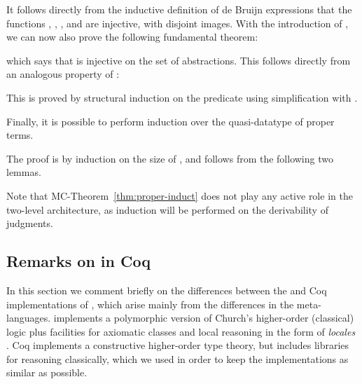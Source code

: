 \documentclass[final]{svjour3}
\begin{document}
It follows directly from the inductive definition of de Bruijn
expressions that the functions , , , and
 are injective, with disjoint images.  With the introduction
of , we can now also prove the following fundamental
theorem:
\begin{goal}
  
\label{thm:inj}
\end{goal}
which says that  is injective on the set of abstractions.
This follows directly from an analogous property of :
\begin{mclemma}
  
\end{mclemma}
This is proved by structural induction on the  predicate
using simplification with  .


Finally, it is possible to perform induction over the quasi-datatype
of proper terms.
\begin{goal}
\label{thm:proper-induct}
 
\end{goal}
The proof is by induction on the size of , and follows from the
following two lemmas.
\begin{mclemma}

\end{mclemma}
\begin{mclemma}

\end{mclemma}
Note that MC-Theorem~\ref{thm:proper-induct} does not play
any active role in the two-level architecture, as induction will be
performed on the derivability of judgments.



\subsection{Remarks on \hybrid in Coq}
\label{ssec:hcoq}


In this section we comment briefly on the differences between the \HOL
and Coq implementations of \hybrid, which arise mainly from the
differences in the meta-languages.  \HOL implements a
polymorphic version of Church's higher-order (classical) logic plus
facilities for axiomatic classes and local reasoning in the form of
\emph{locales} \cite{Ballarin03}.  Coq
implements a constructive higher-order type theory,
but includes
libraries for reasoning classically, which we used in order to keep
the implementations as similar as possible.
\end{document}

